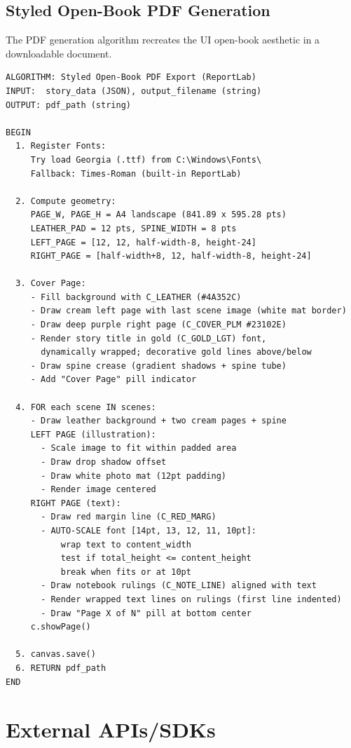 \subsection{Styled Open-Book PDF Generation}

The PDF generation algorithm recreates the UI open-book aesthetic in a downloadable document.

\begin{verbatim}
ALGORITHM: Styled Open-Book PDF Export (ReportLab)
INPUT:  story_data (JSON), output_filename (string)
OUTPUT: pdf_path (string)

BEGIN
  1. Register Fonts:
     Try load Georgia (.ttf) from C:\Windows\Fonts\
     Fallback: Times-Roman (built-in ReportLab)
  
  2. Compute geometry:
     PAGE_W, PAGE_H = A4 landscape (841.89 x 595.28 pts)
     LEATHER_PAD = 12 pts, SPINE_WIDTH = 8 pts
     LEFT_PAGE = [12, 12, half-width-8, height-24]
     RIGHT_PAGE = [half-width+8, 12, half-width-8, height-24]

  3. Cover Page:
     - Fill background with C_LEATHER (#4A352C)
     - Draw cream left page with last scene image (white mat border)
     - Draw deep purple right page (C_COVER_PLM #23102E)
     - Render story title in gold (C_GOLD_LGT) font,
       dynamically wrapped; decorative gold lines above/below
     - Draw spine crease (gradient shadows + spine tube)
     - Add "Cover Page" pill indicator

  4. FOR each scene IN scenes:
     - Draw leather background + two cream pages + spine
     LEFT PAGE (illustration):
       - Scale image to fit within padded area
       - Draw drop shadow offset
       - Draw white photo mat (12pt padding)
       - Render image centered
     RIGHT PAGE (text):
       - Draw red margin line (C_RED_MARG)
       - AUTO-SCALE font [14pt, 13, 12, 11, 10pt]:
           wrap text to content_width
           test if total_height <= content_height
           break when fits or at 10pt
       - Draw notebook rulings (C_NOTE_LINE) aligned with text
       - Render wrapped text lines on rulings (first line indented)
       - Draw "Page X of N" pill at bottom center
     c.showPage()

  5. canvas.save()
  6. RETURN pdf_path
END
\end{verbatim}


\section{External APIs/SDKs}

